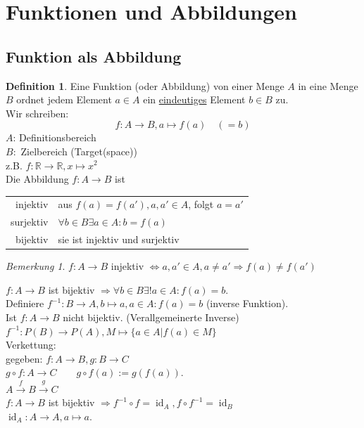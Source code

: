\documentclass[12pt,a4paper,titlepage]{article} %
\theoremstyle{definition}
\newtheorem{defi}[satz]{Definition}
\theoremstyle{remark}
\newtheorem*{bem}{Bemerkung}
\begin{document}
\section{Funktionen und Abbildungen}
\subsection{Funktion als Abbildung}
\begin{defi}
	Eine Funktion (oder Abbildung) von einer Menge $A$ in eine Menge $B$ ordnet jedem Element $a\in A$ ein \underline{eindeutiges} Element $b \in B$ zu.\\
	Wir schreiben:
	\begin{equation*}
		f: A \rightarrow B, a \mapsto f(a)\quad(=b)
	\end{equation*}	
	$A$: Definitionsbereich\\
	$B:$ Zielbereich (Target(space))\\
	z.B. $f: \mathbb{R} \rightarrow \mathbb{R}, x \mapsto x^2$\\
	Die Abbildung $f: A \rightarrow B$ ist\\
	\begin{tabular}{r|l}
		injektiv&aus $f(a) = f(a'), a, a' \in A$, folgt $a=a'$\\
		surjektiv&$\forall b\in B \exists a\in A: b=f(a)$\\
		bijektiv&sie ist injektiv und surjektiv
	\end{tabular}
\end{defi}
\begin{bem}
	$f: A\rightarrow B$ injektiv $\Leftrightarrow a, a'\in A, a \neq a' \Rightarrow f(a) \neq f(a')$
\end{bem}
$f: A\rightarrow B$ ist bijektiv $\Rightarrow \forall b\in B \exists ! a\in A: f(a) = b$.\\
Definiere $f^{-1}: B\rightarrow A, b\mapsto a, a\in A: f(a) = b$ (inverse Funktion).\\
Ist $f: A\rightarrow B$ nicht bijektiv. (Verallgemeinerte Inverse)\\
$f^{-1}: P(B)\rightarrow P(A), M \mapsto\{a\in A|f(a)\in M\}$\\
Verkettung:\\
gegeben: $f:A\rightarrow B, g: B\rightarrow C$\\
$g\circ f: A\rightarrow C\qquad g\circ f(a):= g(f(a))$.\\
$A\overset{f}{\rightarrow} B \overset{g}{\rightarrow}C$\\
$f: A\rightarrow B$ ist bijektiv $\Rightarrow f^{-1}\circ f = \operatorname{id}_A, f\circ f^{-1} = \operatorname{id}_B$\\
$\operatorname{id}_A: A\rightarrow A, a\mapsto a.$
\end{document}
